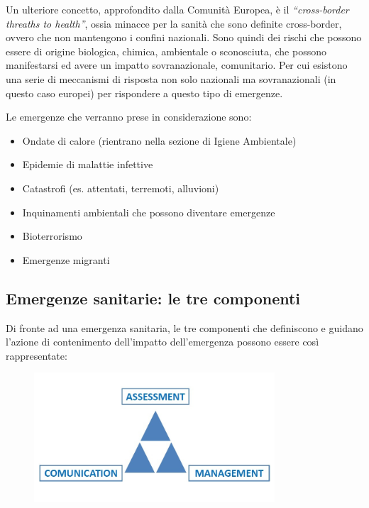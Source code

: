 Un ulteriore concetto, approfondito dalla Comunità Europea, è il
\emph{``cross-border threaths to health''}, ossia minacce per la sanità
che sono definite cross-border, ovvero che non mantengono i confini
nazionali. Sono quindi dei rischi che possono essere di origine
biologica, chimica, ambientale o sconosciuta, che possono manifestarsi
ed avere un impatto sovranazionale, comunitario. Per cui esistono una
serie di meccanismi di risposta non solo nazionali ma sovranazionali (in
questo caso europei) per rispondere a questo tipo di emergenze.

Le emergenze che verranno prese in considerazione sono:

\begin{itemize}
\item
  Ondate di calore (rientrano nella sezione di Igiene Ambientale)
\item
  Epidemie di malattie infettive
\item
  Catastrofi (es. attentati, terremoti, alluvioni)
\item
  Inquinamenti ambientali che possono diventare emergenze
\item
  Bioterrorismo
\item
  Emergenze migranti
\end{itemize}

\subsection{Emergenze sanitarie: le tre componenti}

Di fronte ad una emergenza sanitaria, le tre componenti che definiscono
e guidano l'azione di contenimento dell'impatto dell'emergenza possono
essere così rappresentate:

\begin{figure}[!ht]
\centering
	\includegraphics[width=0.8\textwidth]{26/image2.jpeg}
	\end{figure}

